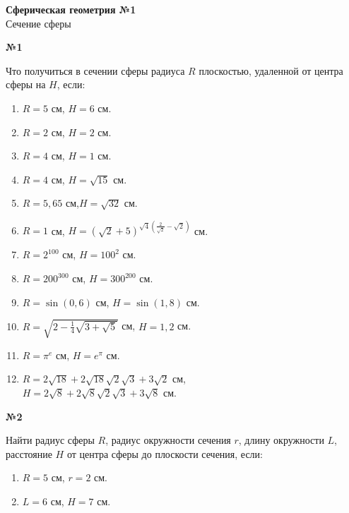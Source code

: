 


    \begin{center}
        \textbf{Сферическая геометрия №1}\\
        Сечение сферы
    \end{center}

    \begin{center}
        \textbf{№1}
    \end{center}

    Что получиться в сечении сферы радиуса $R$ плоскостью, удаленной от центра сферы на $H$, если:\\
    \begin{minipage}[t]{0.5\textwidth}
        \begin{enumerate}
            \setcounter{enumi}{0}
            \item $R = 5$ см, $H = 6$ см.
            \item $R = 2$ см, $H = 2$ см.
            \item $R = 4$ см, $H = 1$ см.
            \item $R = 4$ см, $H = \sqrt {15}$ см.
            \item $R = 5,65$ см,$H = \sqrt{32}$ см.
            \item $R = 1$ см, $H = (\sqrt{2} + 5)^{\sqrt{4}\left(\frac{2}{\sqrt{2}} - \sqrt{2}\right)}$ см.
        \end{enumerate}
    \end{minipage}
    \begin{minipage}[t]{0.5\textwidth}
        \begin{enumerate}
            \setcounter{enumi}{6}
            \item $R = 2 ^ {100}$ см, $H = 100 ^ 2$ см.
            \item $R = 200 ^ {300}$ см, $H = 300 ^ {200}$ см.
            \item $R = \sin(0,6)$ см, $H = \sin(1,8)$ см.
            \item $R = \sqrt{2 - \frac{1}{4}\sqrt{3 + \sqrt{5}}}$ см, $H = 1,2$ см.
            \item $R = \pi ^ e$ см, $H = e ^ \pi$ см.
            \item $R = 2\sqrt{18} + 2\sqrt{18}\sqrt{2}\sqrt{3} + 3\sqrt{2}$ см, \\
            $H = 2\sqrt{8} + 2\sqrt{8}\sqrt{2}\sqrt{3} + 3\sqrt{8}$ см.
        \end{enumerate}
    \end{minipage}

     \begin{center}
        \textbf{№2}
    \end{center}

    Найти радиус сферы $R$, радиус окружности сечения $r$, длину окружности $L$, расстояние $H$ от центра сферы
    до плоскости сечения, если:
    \begin{enumerate}
        \item $R = 5$ см, $r = 2$ см.
        \item $L = 6$ см, $H = 7$ см.
    \end{enumerate}

